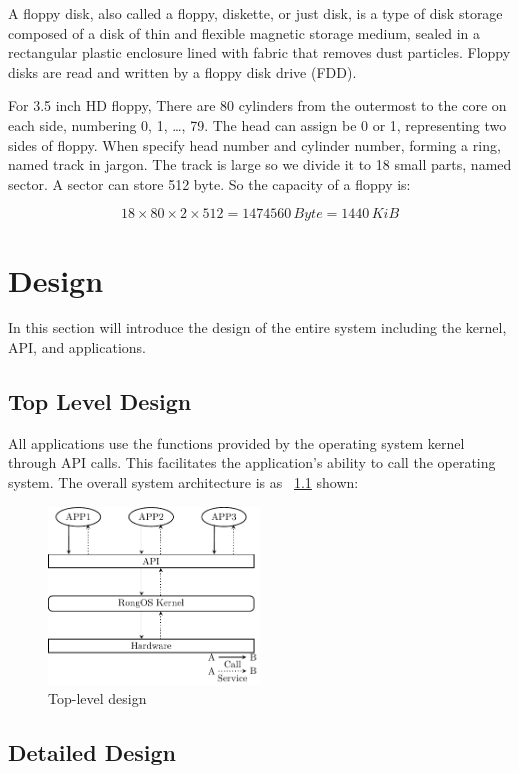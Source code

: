 \documentclass{swfcthesis}
\begin{document}
A floppy disk, also called a floppy, diskette, or just disk, is a type of disk storage
composed of a disk of thin and flexible magnetic storage medium, sealed in a rectangular
plastic enclosure lined with fabric that removes dust particles. Floppy disks are read and
written by a floppy disk drive (FDD)\cite{wiki:floppy}.

For 3.5 inch HD floppy,  There are 80 cylinders from the outermost to
the core on each side, numbering 0, 1, \ldots, 79. The head can assign be 0 or 1,
representing two sides of floppy. When specify head number and cylinder number, forming a
ring, named track in jargon. The track is large so we divide it to 18 small parts, named
sector. A sector can store 512 byte. So the capacity of a floppy is:

\[18 \times 80 \times 2 \times 512 = 1474560\,Byte = 1440\,KiB\]

\fi


\chapter{Design}
In this section will introduce the design of the entire system including the kernel, API,
and applications.


\section{Top Level Design}
All applications use the functions provided by the operating system kernel through API
calls. This facilitates the application's ability to call the operating system. The
overall system architecture is as ~\ref{fig:top-level} shown:

\begin{figure}[!htbp]
  \centering
  \includegraphics[width=0.5\textwidth]{topDes.pdf}
  \caption{Top-level design}
  \label{fig:top-level}
\end{figure}


\section{Detailed Design}
\label{sec:detailed-design}
\end{document}
